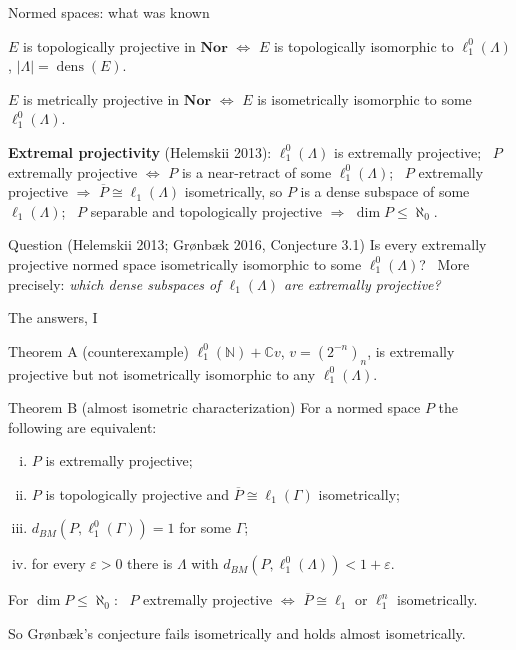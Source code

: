 \documentclass[10pt,aspectratio=169]{beamer}
\newcommand{\Nor}{\mathbf{Nor}}
\newcommand{\lo}[1]{\ell_1^0(#1)}
\newcommand{\ellone}[1]{\ell_1(#1)}
\newcommand{\dens}{\operatorname{dens}}
\newcommand{\BM}{d_{BM}}
\newcommand{\NN}{\mathbb N}
\newcommand{\CC}{\mathbb C}
\begin{document}
\begin{frame}{Normed spaces: what was known}
  \begin{theorem}[Gr{\o}nb{\ae}k 2016]
    $E$ is topologically projective in $\Nor$ $\iff$ $E$ is topologically
    isomorphic to $\lo\Lambda$, $|\Lambda|=\dens(E)$.
  \end{theorem}
  \begin{theorem}[Helemskii 2013]
    $E$ is metrically projective in $\Nor$ $\iff$ $E$ is isometrically
    isomorphic to some $\lo\Lambda$.
  \end{theorem}
  \textbf{Extremal projectivity} (Helemskii 2013):
  $\lo\Lambda$ is extremally projective; \
  $P$ extremally projective $\iff$ $P$ is a near-retract of some $\lo\Lambda$; \
  $P$ extremally projective $\Rightarrow$ $\overline P\cong\ellone\Lambda$
  isometrically, so $P$ is a dense subspace of some $\ellone\Lambda$; \
  $P$ separable and topologically projective $\Rightarrow$ $\dim P\le\aleph_0$.
  \begin{alertblock}{Question (Helemskii 2013; Gr{\o}nb{\ae}k 2016, Conjecture 3.1)}
    Is every extremally projective normed space isometrically isomorphic to some
    $\lo\Lambda$? \ More precisely: \emph{which dense subspaces of $\ellone\Lambda$
    are extremally projective?}
  \end{alertblock}
\end{frame}

\begin{frame}{The answers, I}
  \begin{block}{Theorem A (counterexample)}
    $\lo\NN+\CC v$, $v=(2^{-n})_n$, is extremally projective but not
    isometrically isomorphic to any $\lo\Lambda$.
  \end{block}
  \begin{block}{Theorem B (almost isometric characterization)}
    For a normed space $P$ the following are equivalent:
    \begin{enumerate}[(i)]
      \item $P$ is extremally projective;
      \item $P$ is topologically projective and $\overline P\cong\ellone\Gamma$ isometrically;
      \item $\BM(P,\lo\Gamma)=1$ for some $\Gamma$;
      \item for every $\varepsilon>0$ there is $\Lambda$ with $\BM(P,\lo\Lambda)<1+\varepsilon$.
    \end{enumerate}
    For $\dim P\le\aleph_0$: \ $P$ extremally projective $\iff$
    $\overline P\cong\ell_1$ or $\ell_1^n$ isometrically.
  \end{block}
  So Gr{\o}nb{\ae}k's conjecture fails isometrically and holds almost
  isometrically.
\end{frame}
\end{document}
